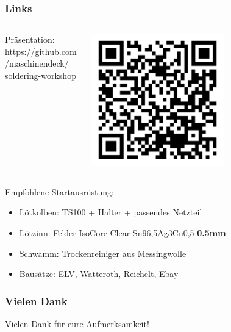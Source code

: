 \documentclass[10pt]{beamer}
\begin{document}
	\begin{frame}
		\frametitle{Links}
		\begin{columns}[] %
			\begin{column}{.5\textwidth}
				\large Präsentation: \normalsize \\
				\vspace{5mm}
				https://github.com/maschinendeck/
				soldering-workshop
			\end{column}
			\begin{column}{.5\textwidth}
				\begin{center}
					\includegraphics[width=0.6\textwidth]{images/qr-code.png}      
				\end{center}
			\end{column}
		\end{columns}
		
		\large
		Empfohlene Startausrüstung:
		\normalsize
		\begin{itemize}
			\item Lötkolben: 	TS100 + Halter + passendes Netzteil
			\item Lötzinn: 		Felder IsoCore Clear Sn96,5Ag3Cu0,5 \textbf{0.5mm}
			\item Schwamm: 		Trockenreiniger aus Messingwolle
			\item Bausätze: 	ELV, Watteroth, Reichelt, Ebay
		\end{itemize}
		
	\end{frame}

	\begin{frame}
	\frametitle{Vielen Dank}
	\centering
	{\LARGE Vielen Dank für eure Aufmerksamkeit!}
	
	\end{frame}
    
\end{document}
